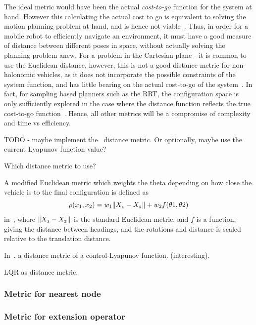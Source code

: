 The ideal metric would have been the actual \textit{cost-to-go} function for the
system at hand. However this calculating the actual cost to go is equivalent to
solving the motion planning problem at hand, and is hence not
viable~\cite{pengchengReducingMetricSensitivity2001}. Thus, in order for a
mobile robot to efficiently navigate an environment, it must have a good measure
of distance between different poses in space, without actually solving the
planning problem anew. For a problem in the Cartesian plane - it is common to
use the Euclidean distance, however, this is not a good distance metric for
non-holonomic vehicles, as it does not incorporate the possible constraints of
the system function, and has little bearing on the actual cost-to-go of the
system~\cite{parkFeedbackMotionPlanning2015}. In fact, for sampling based
planners such as the \ac{RRT}, the configuration space is only sufficiently
explored in the case where the distance function reflects the true cost-to-go
function~\cite{pengchengReducingMetricSensitivity2001}. Hence, all other metrics
will be a compromise of complexity and time vs efficiency.

TODO - maybe implement the~\cite{parkFeedbackMotionPlanning2015} distance
metric. Or optionally, maybe use the current Lyapunov function value?

Which distance metric to use?

A modified Euclidean metric which weights the theta depending on how close the
vehicle is to the final configuration is defined as
\[
  \rho(x_{1},x_{2}) = w_{1}\lVert\mathnormal{X_{1}} - \mathnormal{X_{2}}\rVert +
  w_{2}f(\theta{1},\theta{2})
\]
in~\cite{kuffnerEffectiveSamplingDistance2004}, where \(\lVert\mathnormal{X_{1}}
  - \mathnormal{X_{2}}\rVert\) is the standard Euclidean metric, and \(f\) is a
function, giving the distance between headings, and the rotations and distance
is scaled relative to the translation distance.

In~\cite{parkFeedbackMotionPlanning2015}, a distance metric of a
control-Lyapunov function. (interesting).

\cite{perezLQRRRTOptimalSamplingbased2012a} LQR as distance metric.

\subsubsection{Metric for nearest node}
\subsubsection{Metric for extension operator}

